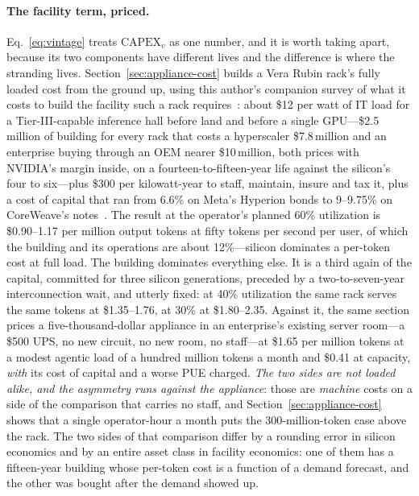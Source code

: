 \paragraph{The facility term, priced.} Eq.~\eqref{eq:vintage} treats $\mathrm{CAPEX}_v$ as one number, and it is worth taking apart, because its two components have different lives and the difference is where the stranding lives. Section~\ref{sec:appliance-cost} builds a Vera Rubin rack's fully loaded cost from the ground up, using this author's companion survey of what it costs to build the facility such a rack requires~\cite{matsuoka-dc-survey}: about \$12 per watt of IT load for a Tier-III-capable inference hall before land and before a single GPU---\$2.5\,million of building for every rack that costs a hyperscaler \$7.8\,million and an enterprise buying through an OEM nearer \$10\,million, both prices with NVIDIA's margin inside, on a fourteen-to-fifteen-year life against the silicon's four to six---plus \$300 per kilowatt-year to staff, maintain, insure and tax it, plus a cost of capital that ran from 6.6\% on Meta's Hyperion bonds to 9--9.75\% on CoreWeave's notes~\cite{epoch-dc-tco,kpmg-dc-opex,meta-hyperion-bond,coreweave-notes}. The result at the operator's planned 60\% utilization is \$0.90--1.17 per million output tokens at fifty tokens per second per user, of which the building and its operations are about 12\%---silicon dominates a per-token cost at full load. The building dominates everything else. It is a third again of the capital, committed for three silicon generations, preceded by a two-to-seven-year interconnection wait, and utterly fixed: at 40\% utilization the same rack serves the same tokens at \$1.35--1.76, at 30\% at \$1.80--2.35. Against it, the same section prices a five-thousand-dollar appliance in an enterprise's existing server room---a \$500 UPS, no new circuit, no new room, no staff---at \$1.65 per million tokens at a modest agentic load of a hundred million tokens a month and \$0.41 at capacity, \emph{with} its cost of capital and a worse PUE charged. \emph{The two sides are not loaded alike, and the asymmetry runs against the appliance}: those are \emph{machine} costs on a side of the comparison that carries no staff, and Section~\ref{sec:appliance-cost} shows that a single operator-hour a month puts the 300-million-token case above the rack. The two sides of that comparison differ by a rounding error in silicon economics and by an entire asset class in facility economics: one of them has a fifteen-year building whose per-token cost is a function of a demand forecast, and the other was bought after the demand showed up.

